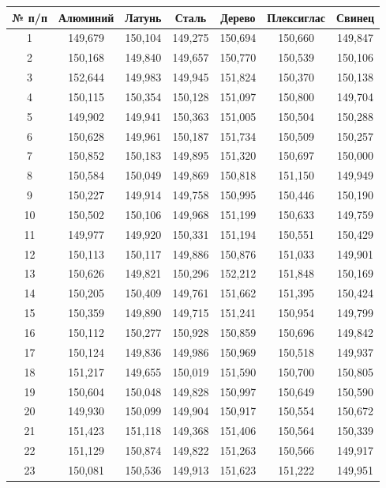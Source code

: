 {\tiny
\begin{longtable}{|c|c|c|c|c|c|c|}
\hline
№ п/п & Алюминий & Латунь & Сталь & Дерево & Плексиглас & Свинец \\
\hline
1 & 149,679 & 150,104 & 149,275 & 150,694 & 150,660 & 149,847 \\
2 & 150,168 & 149,840 & 149,657 & 150,770 & 150,539 & 150,106 \\
3 & 152,644 & 149,983 & 149,945 & 151,824 & 150,370 & 150,138 \\
4 & 150,115 & 150,354 & 150,128 & 151,097 & 150,800 & 149,704 \\
5 & 149,902 & 149,941 & 150,363 & 151,005 & 150,504 & 150,288 \\
6 & 150,628 & 149,961 & 150,187 & 151,734 & 150,509 & 150,257 \\
7 & 150,852 & 150,183 & 149,895 & 151,320 & 150,697 & 150,000 \\
8 & 150,584 & 150,049 & 149,869 & 150,818 & 151,150 & 149,949 \\
9 & 150,227 & 149,914 & 149,758 & 150,995 & 150,446 & 150,190 \\
10 & 150,502 & 150,106 & 149,968 & 151,199 & 150,633 & 149,759 \\
11 & 149,977 & 149,920 & 150,331 & 151,194 & 150,551 & 150,429 \\
12 & 150,113 & 150,117 & 149,886 & 150,876 & 151,033 & 149,901 \\
13 & 150,626 & 149,821 & 150,296 & 152,212 & 151,848 & 150,169 \\
14 & 150,205 & 150,409 & 149,761 & 151,662 & 151,395 & 150,424 \\
15 & 150,359 & 149,890 & 149,715 & 151,241 & 150,954 & 149,799 \\
16 & 150,112 & 150,277 & 150,928 & 150,859 & 150,696 & 149,842 \\
17 & 150,124 & 149,836 & 149,986 & 150,969 & 150,518 & 149,937 \\
18 & 151,217 & 149,655 & 150,019 & 151,590 & 150,700 & 150,805 \\
19 & 150,604 & 150,048 & 149,828 & 150,997 & 150,649 & 150,590 \\
20 & 149,930 & 150,099 & 149,904 & 150,917 & 150,554 & 150,672 \\
21 & 151,423 & 151,118 & 149,368 & 151,406 & 150,564 & 150,339 \\
22 & 151,129 & 150,874 & 149,822 & 151,263 & 150,566 & 149,917 \\
23 & 150,081 & 150,536 & 149,913 & 151,623 & 151,222 & 149,951 \\

\end{longtable}}
